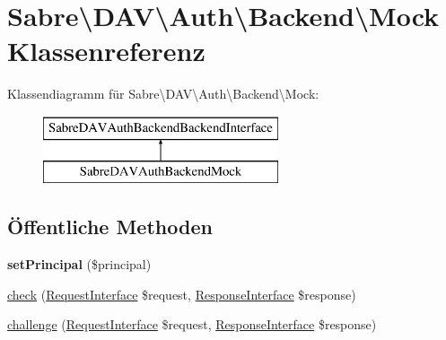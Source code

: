 \hypertarget{class_sabre_1_1_d_a_v_1_1_auth_1_1_backend_1_1_mock}{}\section{Sabre\textbackslash{}D\+AV\textbackslash{}Auth\textbackslash{}Backend\textbackslash{}Mock Klassenreferenz}
\label{class_sabre_1_1_d_a_v_1_1_auth_1_1_backend_1_1_mock}
Klassendiagramm für Sabre\textbackslash{}D\+AV\textbackslash{}Auth\textbackslash{}Backend\textbackslash{}Mock\+:\begin{figure}[H]
\begin{center}
\leavevmode
\includegraphics[height=2.000000cm]{class_sabre_1_1_d_a_v_1_1_auth_1_1_backend_1_1_mock}
\end{center}
\end{figure}
\subsection*{Öffentliche Methoden}
\begin{DoxyCompactItemize}
\item 
\mbox{\label{class_sabre_1_1_d_a_v_1_1_auth_1_1_backend_1_1_mock_afbf2beb193e0f8f180b43408b84d9546}} 
{\bfseries set\+Principal} (\$principal)
\item 
\mbox{\hyperlink{class_sabre_1_1_d_a_v_1_1_auth_1_1_backend_1_1_mock_af99cedee6ef68eeff7c826d49c7a5b2e}{check}} (\mbox{\hyperlink{interface_sabre_1_1_h_t_t_p_1_1_request_interface}{Request\+Interface}} \$request, \mbox{\hyperlink{interface_sabre_1_1_h_t_t_p_1_1_response_interface}{Response\+Interface}} \$response)
\item 
\mbox{\hyperlink{class_sabre_1_1_d_a_v_1_1_auth_1_1_backend_1_1_mock_a9b95b147eaf9b94e7de858bc4c62cc2d}{challenge}} (\mbox{\hyperlink{interface_sabre_1_1_h_t_t_p_1_1_request_interface}{Request\+Interface}} \$request, \mbox{\hyperlink{interface_sabre_1_1_h_t_t_p_1_1_response_interface}{Response\+Interface}} \$response)
\end{DoxyCompactItemize}
